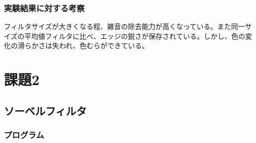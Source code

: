 \documentclass[a4paper,10pt,uplatex,dvipdfmx]{jsarticle}
\begin{document}
\subsubsection{実験結果に対する考察}
フィルタサイズが大きくなる程、雑音の除去能力が高くなっている。また同一サイズの平均値フィルタに比べ、エッジの鋭さが保存されている。しかし、色の変化の滑らかさは失われ、色むらができている。

\section{課題2}
\subsection{ソーベルフィルタ}
\subsubsection{プログラム}

\end{document}
